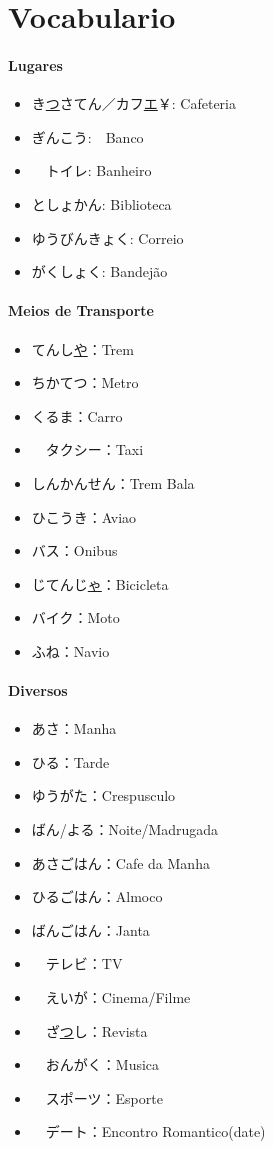 \documentclass[a4paper, 12pt]{article}
\begin{document}
\newpage
\section{Vocabulario}
\begin{CJK}{UTF8}{min}
\paragraph{Lugares}
	\begin{itemize}
		\item き\underline{つ}さてん／カフ\underline{エ}￥: Cafeteria
		\item ぎんこう:　Banco
		\item　トイレ: Banheiro
		\item としょかん: Biblioteca
		\item ゆうびんきょく: Correio
		\item がくしょく: Bandejão
		
	\end{itemize}

\paragraph{Meios de Transporte}
	\begin{itemize}
		\item てんし\underline{や}：Trem
		\item ちかてつ：Metro
		\item くるま：Carro
		\item　タクシー：Taxi
		\item しんかんせん：Trem Bala
		\item ひこうき：Aviao
		\item バス：Onibus
		\item じてんじ\underline{ゃ}：Bicicleta
		\item バイク：Moto
		\item ふね：Navio
	\end{itemize}

\paragraph{Diversos}
	\begin{itemize}
		\item あさ：Manha
		\item ひる：Tarde
		\item ゆうがた：Crespusculo
		\item ばん/よる：Noite/Madrugada
		\item あさごはん：Cafe da Manha
		\item ひるごはん：Almoco
		\item ばんごはん：Janta
		\item　テレビ：TV
		\item　えいが：Cinema/Filme
		\item　ざ\underline{つ}し：Revista
		\item　おんがく：Musica
		\item　スポーツ：Esporte
		\item　デート：Encontro Romantico(date)
	\end{itemize}


\end{CJK}
\end{document}

